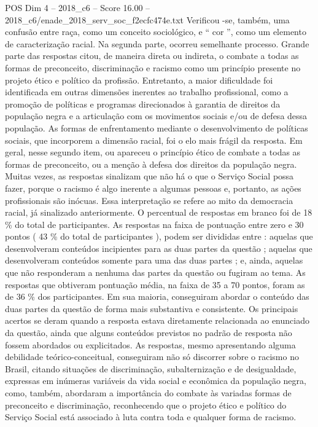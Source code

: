 \begin{textsample}{POS Dim 4 – 2018\_c6 – Score 16.00 – 2018\_c6/enade\_2018\_serv\_soc\_f2ecfc474e.txt}
Verificou -se, também, uma confusão entre raça, como um conceito sociológico, e “ cor ”, como um elemento de caracterização racial.
Na segunda parte, ocorreu semelhante processo.
Grande parte das respostas citou, de maneira direta ou indireta, o combate a todas as formas de preconceito, discriminação e racismo como um princípio presente no projeto ético e político da profissão.
Entretanto, a maior dificuldade foi identificada em outras dimensões inerentes ao trabalho profissional, como a promoção de políticas e programas direcionados à garantia de direitos da população negra e a articulação com os movimentos sociais e/ou de defesa dessa população.
As formas de enfrentamento mediante o desenvolvimento de políticas sociais, que incorporem a dimensão racial, foi o elo mais frágil da resposta.
Em geral, nesse segundo item, ou apareceu o princípio ético de combate a todas as formas de preconceito, ou a menção à defesa dos direitos da população negra.
Muitas vezes, as respostas sinalizam que não há o que o Serviço Social possa fazer, porque o racismo é algo inerente a algumas pessoas e, portanto, as ações profissionais são inócuas.
Essa interpretação se refere ao mito da democracia racial, já sinalizado anteriormente.
O percentual de respostas em branco foi de 18 \% do total de participantes.
As respostas na faixa de pontuação entre zero e 30 pontos ( 43 \% do total de participantes ), podem ser divididas entre : aquelas que desenvolveram conteúdos incipientes para as duas partes da questão ; aquelas que desenvolveram conteúdos somente para uma das duas partes ; e, ainda, aquelas que não responderam a nenhuma das partes da questão ou fugiram ao tema.
As respostas que obtiveram pontuação média, na faixa de 35 a 70 pontos, foram as de 36 \% dos participantes.
Em sua maioria, conseguiram abordar o conteúdo das duas partes da questão de forma mais substantiva e consistente.
Os principais acertos se deram quando a resposta estava diretamente relacionada ao enunciado da questão, ainda que alguns conteúdos previstos no padrão de resposta não fossem abordados ou explicitados.
As respostas, mesmo apresentando alguma debilidade teórico-conceitual, conseguiram não só discorrer sobre o racismo no Brasil, citando situações de discriminação, subalternização e de desigualdade, expressas em inúmeras variáveis da vida social e econômica da população negra, como, também, abordaram a importância do combate às variadas formas de preconceito e discriminação, reconhecendo que o projeto ético e político do Serviço Social está associado à luta contra toda e qualquer forma de racismo.

\end{textsample}
